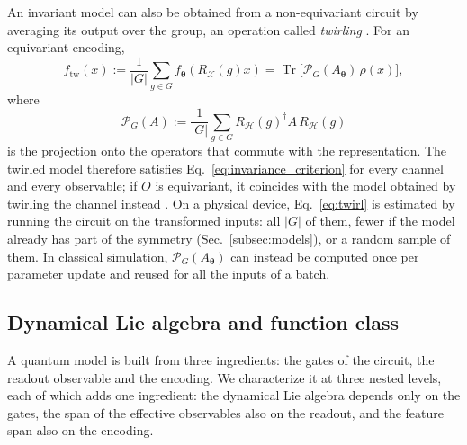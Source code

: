 \documentclass[aps,pra,reprint,superscriptaddress,longbibliography]{revtex4-2}
\newcommand{\tr}{\operatorname{Tr}}
\newcommand{\Hi}{\mathcal{H}}
\newcommand{\RH}{R_{\Hi}}
\begin{document}
An invariant model can also be obtained from a non-equivariant circuit by averaging its output over the group, an operation called \emph{twirling} \citep{meyer2023exploiting,nguyen2024theory}. For an equivariant encoding,
\begin{equation}
f_{\mathrm{tw}}(x):=\frac{1}{|G|}\sum_{g\in G}f_{\boldsymbol\theta}(R_{\mathcal X}(g)x)=\tr\bigl[\mathcal P_G(A_{\boldsymbol\theta})\,\rho(x)\bigr],
\label{eq:twirl}
\end{equation}
where
\begin{equation}
\mathcal P_G(A):=\frac{1}{|G|}\sum_{g\in G}\RH(g)^\dagger A\,\RH(g)
\label{eq:group_average}
\end{equation}
is the projection onto the operators that commute with the representation. The twirled model therefore satisfies Eq.~\eqref{eq:invariance_criterion} for every channel and every observable; if $O$ is equivariant, it coincides with the model obtained by twirling the channel instead \citep{nguyen2024theory}. On a physical device, Eq.~\eqref{eq:twirl} is estimated by running the circuit on the transformed inputs: all $|G|$ of them, fewer if the model already has part of the symmetry (Sec.~\ref{subsec:models}), or a random sample of them. In classical simulation, $\mathcal P_G(A_{\boldsymbol\theta})$ can instead be computed once per parameter update and reused for all the inputs of a batch.

\subsection{Dynamical Lie algebra and function class}\label{subsec:terms}

A quantum model is built from three ingredients: the gates of the circuit, the readout observable and the encoding. We characterize it at three nested levels, each of which adds one ingredient: the dynamical Lie algebra depends only on the gates, the span of the effective observables also on the readout, and the feature span also on the encoding.
\end{document}
